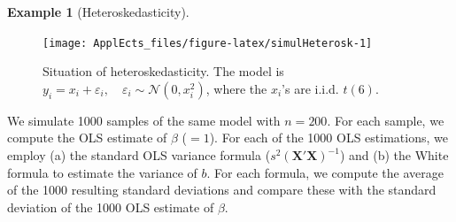 \documentclass[
  12pt,
]{book}
\theoremstyle{definition}
\theoremstyle{definition}
\newtheorem{example}{Example}[chapter]
\theoremstyle{definition}
\theoremstyle{definition}
\theoremstyle{remark}
\begin{document}
\begin{example}[Heteroskedasticity]
\begin{figure}
\texttt{[image: ApplEcts\_files/figure-latex/simulHeterosk-1]} \caption{Situation of heteroskedasticity. The model is $y_i = x_i + \varepsilon_i, \quad \varepsilon_i \sim \mathcal{N}(0,x_i^2)$, where the $x_i$'s are i.i.d. $t(6)$.}\label{fig:simulHeterosk}
\end{figure}

We simulate 1000 samples of the same model with \(n=200\). For each sample, we compute the OLS estimate of \(\beta\) (\(=1\)). For each of the 1000 OLS estimations, we employ (a) the standard OLS variance formula (\(s^2 (\mathbf{X}'\mathbf{X})^{-1}\)) and (b) the White formula to estimate the variance of \(b\). For each formula, we compute the average of the 1000 resulting standard deviations and compare these with the standard deviation of the 1000 OLS estimate of \(\beta\).


\end{example}
\end{document}
